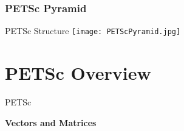 





\begin{frame}[fragile]
\frametitle{PETSc Pyramid}
 \begin{block}{PETSc Structure} \vspace{0.3cm}
   \texttt{[image: PETScPyramid.jpg]}
 \end{block}

\end{frame}




\section{PETSc Overview}
\begin{frame}{PETSc}
   \begin{center} \Large \textbf{Vectors and Matrices} \end{center}
\end{frame}





%
%
















